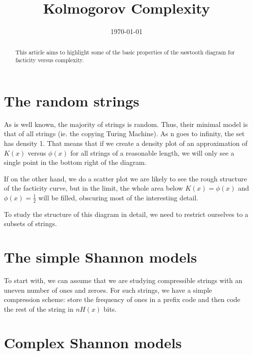 \documentclass{article}
\title{Kolmogorov Complexity}
\date{\today}
\theoremstyle{definition}
\begin{document}
\maketitle

\begin{abstract}
\noindent This article aims to highlight some of the basic properties of the sawtooth diagram for facticity versus complexity.
\end{abstract}

\section*{The random strings}

As is well known, the majority of strings is random. Thus, their minimal model is that of all strings (ie. the copying Turing Machine). As n goes to infinity, the set has density 1. That means that if we create a density plot of an approximation of $K(x)$ versus $\phi(x)$ for all strings of a reasonable length, we will only see a single point in the bottom right of the diagram. 

If on the other hand, we do a scatter plot we are likely to see the rough structure of the facticity curve, but in the limit, the whole area below $K(x) = \phi(x)$ and $\phi(x) = \frac{1}{2}$ will be filled, obscuring most of the interesting detail.

To study the structure of this diagram in detail, we need to restrict ourselves to a subsets of strings. 

\section*{The simple Shannon models}

To start with, we can assume that we are studying compressible strings with an 
uneven number of ones and zeroes. For such strings, we have a simple compression scheme: store the frequency of ones in a prefix code and then code the rest of the string in $nH(x)$ bits.


\section*{Complex Shannon models}
\end{document}
